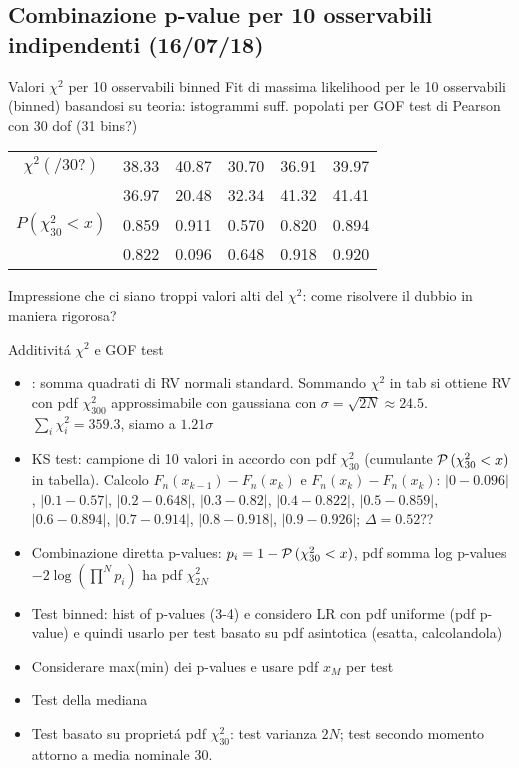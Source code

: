 \subsection{{Combinazione p-value per 10 osservabili indipendenti (16/07/18)}}
\begin{frame}{Valori $\chi^2$ per 10 osservabili binned}
	Fit di massima likelihood per le 10 osservabili (binned) basandosi su teoria: istogrammi suff. popolati per GOF test di Pearson con 30 dof (31 bins?)
	\begin{table}[h!]
		\centering
		\begin{tabular}{||cccccc||} 
			$\chi^2(/30?)$&38.33&40.87&30.70&36.91&39.97\\
			&36.97&20.48&32.34&41.32&41.41\\
			$P(\chi^2_{30}<x)$&0.859&0.911&0.570&0.820&0.894\\
			&0.822&0.096&0.648&0.918&0.920\\
		\end{tabular}
	\end{table}
	Impressione che ci siano troppi valori alti del $\chi^2$: come risolvere il dubbio in maniera rigorosa?
\end{frame}
\begin{frame}{Additivit\'a $\chi^2$ e GOF test}
	\begin{itemize}
	\item {}: somma quadrati di RV normali standard.
			Sommando $\chi^2$ in tab si ottiene RV con pdf $\chi^2_{300}$ approssimabile con gaussiana con $\sigma=\sqrt{2N}\approx24.5$.
			$\sum_i\chi^2_i=359.3$, siamo a $1.21\sigma$
	\item KS test: campione di 10 valori in accordo con pdf $\chi^2_{30}$ (cumulante $\operatorname{\mathcal{P}}{(\chi^2_{30}<x)}$ in tabella). Calcolo $F_n(x_{k-1})-F_n(x_k)$ e $F_n(x_k)-F_n(x_k)$:  $|0-0.096|$, $|0.1-0.57|$, $|0.2-0.648|$, $|0.3-0.82|$, $|0.4-0.822|$, $|0.5-0.859|$, $|0.6-0.894|$, $|0.7-0.914|$, $|0.8-0.918|$, $|0.9-0.926|$; $\Delta=0.52$??
	\item Combinazione diretta p-values: $p_i=1-\operatorname{\mathcal{P}}{(\chi^2_{30}<x)}$, pdf somma log p-values $-2\log{(\prod^Np_i)}$ ha pdf $\chi^2_{2N}$
	\item Test binned: hist of p-values (3-4) e considero LR con pdf uniforme (pdf p-value) e quindi usarlo per test basato su pdf asintotica (esatta, calcolandola)
	\item Considerare max(min) dei p-values e usare pdf $x_M$ per test
	\item Test della mediana
	\item Test basato su propriet\'a pdf $\chi^2_{30}$: test varianza $2N$; test secondo momento attorno a media nominale 30.
\end{itemize}
\end{frame}

